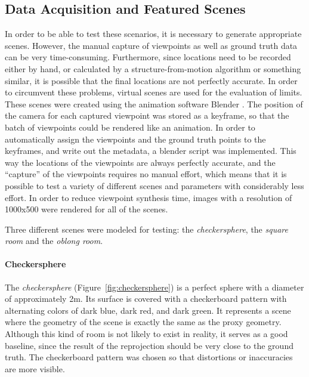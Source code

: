 \subsection{Data Acquisition and Featured Scenes} \label{subsec:data_acquisition}
In order to be able to test these scenarios, it is necessary to generate appropriate scenes. However, the manual capture of viewpoints as well as ground truth data can be very time-consuming. Furthermore, since locations need to be recorded either by hand, or calculated by a structure-from-motion algorithm or something similar, it is possible that the final locations are not perfectly accurate. In order to circumvent these problems, virtual scenes are used for the evaluation of limits. These scenes were created using the animation software Blender \cite{blender}. The position of the camera for each captured viewpoint was stored as a keyframe, so that the batch of viewpoints could be rendered like an animation. In order to automatically assign the viewpoints and the ground truth points to the keyframes, and write out the metadata, a blender script was implemented. This way the locations of the viewpoints are always perfectly accurate, and the ``capture'' of the viewpoints requires no manual effort, which means that it is possible to test a variety of different scenes and parameters with considerably less effort. In order to reduce viewpoint synthesis time, images with a resolution of 1000x500 were rendered for all of the scenes.

Three different scenes were modeled for testing: the \emph{checkersphere}, the \emph{square room} and the \emph{oblong room}.%

\paragraph{Checkersphere}
The \emph{checkersphere} (Figure~\ref{fig:checkersphere}) is a perfect sphere with a diameter of approximately 2m. Its surface is covered with a checkerboard pattern with alternating colors of dark blue, dark red, and dark green. It represents a scene where the geometry of the scene is exactly the same as the proxy geometry. Although this kind of room is not likely to exist in reality, it serves as a good baseline, since the result of the reprojection should be very close to the ground truth. The checkerboard pattern was chosen so that distortions or inaccuracies are more visible.


